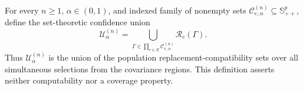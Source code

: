 For every \(n\geq1\), \(\alpha\in(0,1)\), and indexed family of nonempty sets \(\mathcal C^{(n)}_{e,\alpha}\subseteq\mathbb S_{++}^{p}\), define the set-theoretic confidence union
\[
\mathcal U^{(n)}_{\alpha}
=\bigcup_{\Gamma\in\prod_{e\in E}\mathcal C^{(n)}_{e,\alpha}}
\mathcal R_c(\Gamma).
\]
Thus \(\mathcal U^{(n)}_{\alpha}\) is the union of the population replacement-compatibility sets over all simultaneous selections from the covariance regions. This definition asserts neither computability nor a coverage property.